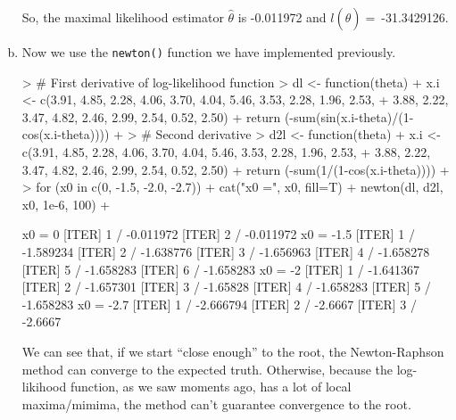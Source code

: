 \documentclass{article}
\begin{document}
\begin{enumerate}[(a)]
\begin{Schunk}
\end{Schunk}
    So, the maximal likelihood estimator $\hat \theta$ is -0.011972 and $l(\hat \theta)=~$-31.3429126.
    \item Now we use the \verb=newton()= function we have implemented previously.
\begin{Schunk}
\begin{Sinput}
> # First derivative of log-likelihood function
> dl <- function(theta){
+     x.i <- c(3.91, 4.85, 2.28, 4.06, 3.70, 4.04, 5.46, 3.53, 2.28, 1.96, 2.53, 
+              3.88, 2.22, 3.47, 4.82, 2.46, 2.99, 2.54, 0.52, 2.50)
+     return (-sum(sin(x.i-theta)/(1-cos(x.i-theta))))
+ }
> # Second derivative
> d2l <- function(theta){
+     x.i <- c(3.91, 4.85, 2.28, 4.06, 3.70, 4.04, 5.46, 3.53, 2.28, 1.96, 2.53,
+              3.88, 2.22, 3.47, 4.82, 2.46, 2.99, 2.54, 0.52, 2.50)
+     return (-sum(1/(1-cos(x.i-theta))))
+ }
> for (x0 in c(0, -1.5, -2.0, -2.7)){
+     cat("x0 =", x0, fill=T)
+     newton(dl, d2l, x0, 1e-6, 100)
+ }
\end{Sinput}
\begin{Soutput}
x0 = 0
[ITER] 1 / -0.011972
[ITER] 2 / -0.011972
x0 = -1.5
[ITER] 1 / -1.589234
[ITER] 2 / -1.638776
[ITER] 3 / -1.656963
[ITER] 4 / -1.658278
[ITER] 5 / -1.658283
[ITER] 6 / -1.658283
x0 = -2
[ITER] 1 / -1.641367
[ITER] 2 / -1.657301
[ITER] 3 / -1.65828
[ITER] 4 / -1.658283
[ITER] 5 / -1.658283
x0 = -2.7
[ITER] 1 / -2.666794
[ITER] 2 / -2.6667
[ITER] 3 / -2.6667
\end{Soutput}
\end{Schunk}
    We can see that, if we start ``close enough'' to the root, the Newton-Raphson method can converge to the expected truth. Otherwise, because the log-likihood function, as we saw moments ago, has a lot of local maxima/mimima, the method can't guarantee convergence to the root.
\end{enumerate}
\end{document}
